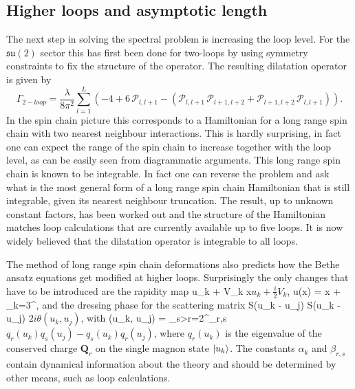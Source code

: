 \subsection{Higher loops and asymptotic length}

The next step in solving the spectral problem is increasing the loop level. 
For the $\mathfrak{su}(2)$ sector this has first been done for two-loops by using symmetry constraints to fix the structure of the operator. 
The resulting dilatation operator is given by \cite{Beisert:2003tq}
\begin{equation}
	\Gamma_{2-loop} = \frac{\lambda}{8\pi^2}\sum_{l=1}^L \left(-4 + 6 \, \mathcal{P}_{l,l+1} - \left( \mathcal{P}_{l,l+1} \, \mathcal{P}_{l+1,l+2} + \mathcal{P}_{l+1,l+2} \, \mathcal{P}_{l,l+1} \right) \right).
\end{equation}
In the spin chain picture this corresponds to a Hamiltonian for a long range spin chain with two nearest neighbour interactions. 
This is hardly surprising, in fact one can expect the range of the spin chain to increase together with the loop level, as can be easily seen from diagrammatic arguments.
This long range spin chain is known to be integrable.
In fact one can reverse the problem and ask what is the most general form of a long range spin chain Hamiltonian that is still integrable, given its nearest neighbour truncation. 
The result, up to unknown constant factors, has been worked out \cite{Bargheer:2009xy} and the structure of the Hamiltonian matches loop calculations that are currently available up to five loops. 
It is now widely believed that the dilatation operator is integrable to all loops.

The method of long range spin chain deformations also predicts how the Bethe ansatz equations get modified at higher loops. 
Surprisingly the only changes that have to be introduced are the rapidity map
\beq
	u_k +  V_k \rightarrow x\(u_k + \frac{i}{2} V_k\), \;\;\; u(x) = x + \sum_{k=3}^\infty {},
\eeq
and the dressing phase for the scattering matrix
\beq
	\label{eq:deformed_dressing}
	S(u_k - u_j) \rightarrow S(u_k - u_j) \exp\( 2i\theta(u_k, u_j) \),
\eeq
with
\beq
	\theta(u_k, u_j) = \sum_{s>r=2}^\infty \beta_{r,s} \( q_r(u_k)q_s(u_j) - q_s(u_k)q_r(u_j) \),
\eeq
where $q_r(u_k)$ is the eigenvalue of the conserved charge $\mathbf{Q}_r$ on the single magnon state $|u_k\rangle$.
The constants $\alpha_k$ and $\beta_{r,s}$ contain dynamical information about the theory and should be determined by other means, such as loop calculations.


